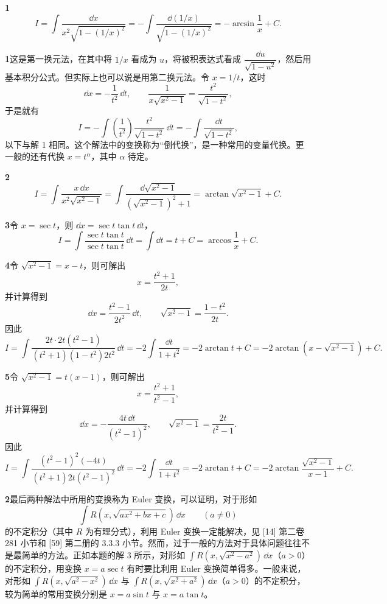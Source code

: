 \begin{xsolution}
\textbf{1}\quad
\[
  I=\int\frac{\dd x}{x^2\sqrt{1-(1/x)^2}}
   =-\int\frac{\dd(1/x)}{\sqrt{1-(1/x)^2}}
   =-\arcsin\frac1x+C.
\]
\end{xsolution}

\begin{xremark}
\textbf{1}\quad 这是第一换元法，在其中将 $1/x$ 看成为 $u$，将被积表达式看成 $\dfrac{\dd u}{\sqrt{1-u^2}}$，然后用基本积分公式。但实际上也可以说是用第二换元法。令 $x=1/t$，这时
\[
  \dd x=-\frac1{t^2}\,\dd t,
  \qquad
  \frac1{x\sqrt{x^2-1}}=\frac{t^2}{\sqrt{1-t^2}},
\]
于是就有
\[
  I=-\int\left(\frac1{t^2}\right)\frac{t^2}{\sqrt{1-t^2}}\,\dd t
   =-\int\frac{\dd t}{\sqrt{1-t^2}},
\]
以下与解 1 相同。这个解法中的变换称为“倒代换”，是一种常用的变量代换。更一般的还有代换 $x=t^\alpha$，其中 $\alpha$ 待定。
\end{xremark}

\begin{xsolution}
\textbf{2}\quad
\[
  I=\int\frac{x\,\dd x}{x^2\sqrt{x^2-1}}
   =\int\frac{\dd\sqrt{x^2-1}}{(\sqrt{x^2-1})^2+1}
   =\arctan\sqrt{x^2-1}+C.
\]
\end{xsolution}

\begin{xsolution}
\textbf{3}\quad 令 $x=\sec t$，则 $\dd x=\sec t\tan t\,\dd t$，
\[
  I=\int\frac{\sec t\tan t}{\sec t\tan t}\,\dd t
   =\int\dd t=t+C=\arccos\frac1x+C.
\]
\end{xsolution}

\begin{xsolution}
\textbf{4}\quad 令 $\sqrt{x^2-1}=x-t$，则可解出
\[
  x=\frac{t^2+1}{2t},
\]
并计算得到
\[
  \dd x=\frac{t^2-1}{2t^2}\,\dd t,
  \qquad
  \sqrt{x^2-1}=\frac{1-t^2}{2t}.
\]
因此
\[
  I=\int\frac{2t\cdot2t(t^2-1)}{(t^2+1)(1-t^2)2t^2}\,\dd t
   =-2\int\frac{\dd t}{1+t^2}
   =-2\arctan t+C
   =-2\arctan\left(x-\sqrt{x^2-1}\right)+C.
\]
\end{xsolution}

\begin{xsolution}
\textbf{5}\quad 令 $\sqrt{x^2-1}=t(x-1)$，则可解出
\[
  x=\frac{t^2+1}{t^2-1},
\]
并计算得到
\[
  \dd x=-\frac{4t\,\dd t}{(t^2-1)^2},
  \qquad
  \sqrt{x^2-1}=\frac{2t}{t^2-1}.
\]
因此
\[
  I=\int\frac{(t^2-1)^2(-4t)}{(t^2+1)2t(t^2-1)^2}\,\dd t
   =-2\int\frac{\dd t}{1+t^2}
   =-2\arctan t+C
   =-2\arctan\frac{\sqrt{x^2-1}}{x-1}+C.
\]
\end{xsolution}

\begin{xremark}
\textbf{2}\quad 最后两种解法中所用的变换称为 Euler 变换，可以证明，对于形如
\[
  \int R\left(x,\sqrt{ax^2+bx+c}\right)\,\dd x\qquad(a\ne0)
\]
的不定积分（其中 $R$ 为有理分式），利用 Euler 变换一定能解决，见 [14] 第二卷 281 小节和 [59] 第二册的 3.3.3 小节。然而，过于一般的方法对于具体问题往往不是最简单的方法。正如本题的解 3 所示，对形如 $\int R(x,\sqrt{x^2-a^2})\,\dd x$（$a>0$）的不定积分，用变换 $x=a\sec t$ 有时要比利用 Euler 变换简单得多。一般来说，对形如 $\int R(x,\sqrt{a^2-x^2})\,\dd x$ 与 $\int R(x,\sqrt{x^2+a^2})\,\dd x$（$a>0$）的不定积分，较为简单的常用变换分别是 $x=a\sin t$ 与 $x=a\tan t$。
\end{xremark}

